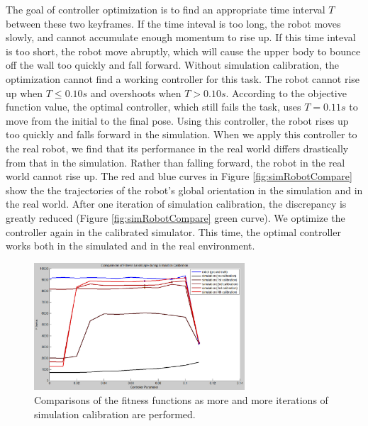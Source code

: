 The goal of controller optimization is to find an appropriate time interval $T$ between these two keyframes. If the time inteval is too long, the robot moves slowly, and cannot accumulate enough momentum to rise up. If this time inteval is too short, the robot move abruptly, which will cause the upper body to bounce off the wall too quickly and fall forward. Without simulation calibration, the optimization cannot find a working controller for this task. The robot cannot rise up when $T\leq 0.10s$ and overshoots when $T > 0.10s$. According to the objective function value, the optimal controller, which still fails the task, uses $T=0.11s$ to move from the initial to the final pose. Using this controller, the robot rises up too quickly and falls forward in the simulation. When we apply this controller to the real robot, we find that its performance in the real world differs drastically from that in the simulation. Rather than falling forward, the robot in the real world cannot rise up. The red and blue curves in Figure \ref{fig:simRobotCompare} show the the trajectories of the robot's global orientation in the simulation and in the real world. After one iteration of simulation calibration, the discrepancy is greatly reduced (Figure \ref{fig:simRobotCompare} green curve). We optimize the controller again in the calibrated simulator. This time, the optimal controller works both in the simulated and in the real environment.

\begin{figure}[!t]
  \centering
  \includegraphics[width=0.7\textwidth]{figures/fitnessLandscape}
  \caption{Comparisons of the fitness functions as more and more iterations of simulation calibration are performed.}
  \label{fig:fitnessLandscape}
\end{figure}

